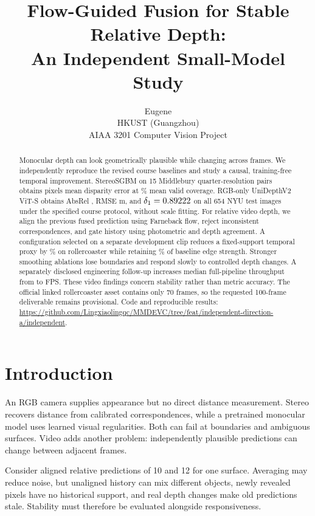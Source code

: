 \documentclass[10pt,twocolumn,letterpaper]{article}
\title{Flow-Guided Fusion for Stable Relative Depth:\\An Independent Small-Model Study}
\author{Eugene\\HKUST (Guangzhou)\\AIAA 3201 Computer Vision Project}
\date{}
\begin{document}
\maketitle
\begin{abstract}
Monocular depth can look geometrically plausible while changing across frames. We independently reproduce the revised course baselines and study a causal, training-free temporal improvement. StereoSGBM on 15 Middlebury quarter-resolution pairs obtains \StereoMAE{} pixels mean disparity error at \StereoCoverage\% mean valid coverage. RGB-only UniDepthV2 ViT-S obtains AbsRel \NyuAbsRel{}, RMSE \NyuRMSE{} m, and $\delta_1=0.89222$ on all 654 NYU test images under the specified course protocol, without scale fitting. For relative video depth, we align the previous fused prediction using Farneback flow, reject inconsistent correspondences, and gate history using photometric and depth agreement. A configuration selected on a separate development clip reduces a fixed-support temporal proxy by \TemporalGain\% on rollercoaster while retaining \EdgeRetention\% of baseline edge strength. Stronger smoothing ablations lose boundaries and respond slowly to controlled depth changes. A separately disclosed engineering follow-up increases median full-pipeline throughput from \OriginalFPS{} to \EfficientFPS{} FPS. These video findings concern stability rather than metric accuracy. The official linked rollercoaster asset contains only 70 frames, so the requested 100-frame deliverable remains provisional. Code and reproducible results: \url{https://github.com/Lingxiaolingqc/MMDEVC/tree/feat/independent-direction-a/independent}.
\end{abstract}

\section{Introduction}
An RGB camera supplies appearance but no direct distance measurement. Stereo recovers distance from calibrated correspondences, while a pretrained monocular model uses learned visual regularities. Both can fail at boundaries and ambiguous surfaces. Video adds another problem: independently plausible predictions can change between adjacent frames.

Consider aligned relative predictions of 10 and 12 for one surface. Averaging may reduce noise, but unaligned history can mix different objects, newly revealed pixels have no historical support, and real depth changes make old predictions stale. Stability must therefore be evaluated alongside responsiveness.
\end{document}
